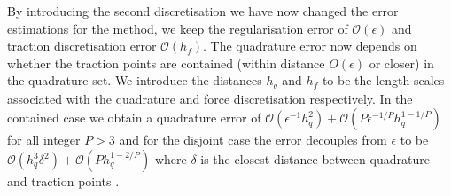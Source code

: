By introducing the second discretisation we have now changed the error estimations for the method, we keep the regularisation error of $\mathcal{O}(\epsilon)$ and traction discretisation error $\mathcal{O}(h_f)$. The quadrature error now depends on whether the traction points are contained (within distance $O(\epsilon)$ or closer) in the quadrature set. We introduce the distances $h_q$ and $h_f$ to be the length scales associated with the quadrature and force discretisation respectively. In the contained case we obtain a quadrature error of $\mathcal{O}(\epsilon^{-1}h^2_q) + \mathcal{O}(P\epsilon^{-1/P}h^{1-1/P}_q)$ for all integer $P>3$ and for the disjoint case the error decouples from $\epsilon$ to be $\mathcal{O}(h^3_q\delta^{2}) + \mathcal{O}(Ph^{1-2/P}_q)$ where $\delta$ is the closest distance between quadrature and traction points \cite{Gallagher2019SharpEquation}.

